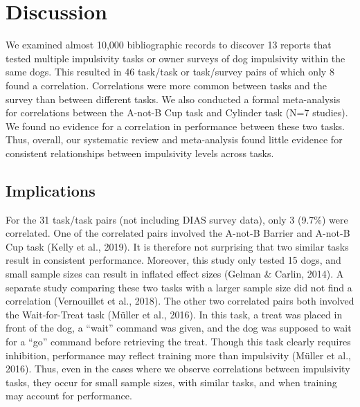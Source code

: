 \documentclass[
  ,pub,floatsintext]{apa6}
\begin{document}
\hypertarget{discussion}{%
\section{Discussion}\label{discussion}}

We examined almost 10,000 bibliographic records to discover 13 reports that tested multiple impulsivity tasks or owner surveys of dog impulsivity within the same dogs. This resulted in 46 task/task or task/survey pairs of which only 8 found a correlation. Correlations were more common between tasks and the survey than between different tasks. We also conducted a formal meta-analysis for correlations between the A-not-B Cup task and Cylinder task (N=7 studies). We found no evidence for a correlation in performance between these two tasks. Thus, overall, our systematic review and meta-analysis found little evidence for consistent relationships between impulsivity levels across tasks.

\hypertarget{implications}{%
\subsection{Implications}\label{implications}}

For the 31 task/task pairs (not including DIAS survey data), only 3 (9.7\%) were correlated. One of the correlated pairs involved the A-not-B Barrier and A-not-B Cup task (Kelly et al., 2019). It is therefore not surprising that two similar tasks result in consistent performance. Moreover, this study only tested 15 dogs, and small sample sizes can result in inflated effect sizes (Gelman \& Carlin, 2014). A separate study comparing these two tasks with a larger sample size did not find a correlation (Vernouillet et al., 2018). The other two correlated pairs both involved the Wait-for-Treat task (Müller et al., 2016). In this task, a treat was placed in front of the dog, a ``wait'' command was given, and the dog was supposed to wait for a ``go'' command before retrieving the treat. Though this task clearly requires inhibition, performance may reflect training more than impulsivity (Müller et al., 2016). Thus, even in the cases where we observe correlations between impulsivity tasks, they occur for small sample sizes, with similar tasks, and when training may account for performance.
\end{document}
